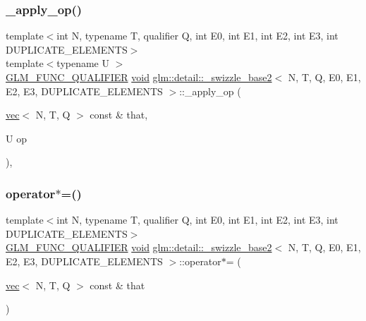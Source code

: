 \subsubsection{\texorpdfstring{\+\_\+apply\+\_\+op()}{\_apply\_op()}}
{\footnotesize\ttfamily template$<$int N, typename T, qualifier Q, int E0, int E1, int E2, int E3, int D\+U\+P\+L\+I\+C\+A\+T\+E\+\_\+\+E\+L\+E\+M\+E\+N\+TS$>$ \\
template$<$typename U $>$ \\
\mbox{\hyperlink{setup_8hpp_a33fdea6f91c5f834105f7415e2a64407}{G\+L\+M\+\_\+\+F\+U\+N\+C\+\_\+\+Q\+U\+A\+L\+I\+F\+I\+ER}} \mbox{\hyperlink{_s_d_l__opengles2__gl2ext_8h_ae5d8fa23ad07c48bb609509eae494c95}{void}} \mbox{\hyperlink{structglm_1_1detail_1_1__swizzle__base2}{glm\+::detail\+::\+\_\+swizzle\+\_\+base2}}$<$ N, T, Q, E0, E1, E2, E3, D\+U\+P\+L\+I\+C\+A\+T\+E\+\_\+\+E\+L\+E\+M\+E\+N\+TS $>$\+::\+\_\+apply\+\_\+op (\begin{DoxyParamCaption}\item[{\mbox{\hyperlink{structglm_1_1vec}{vec}}$<$ N, T, Q $>$ const \&}]{that,  }\item[{U}]{op }\end{DoxyParamCaption})\hspace{0.3cm}{\ttfamily [inline]}, {\ttfamily [protected]}}

\mbox{\label{structglm_1_1detail_1_1__swizzle__base2_a41a9fe45545f5adcd0c529c3a426e29f}} 
\subsubsection{\texorpdfstring{operator$\ast$=()}{operator*=()}}
{\footnotesize\ttfamily template$<$int N, typename T, qualifier Q, int E0, int E1, int E2, int E3, int D\+U\+P\+L\+I\+C\+A\+T\+E\+\_\+\+E\+L\+E\+M\+E\+N\+TS$>$ \\
\mbox{\hyperlink{setup_8hpp_a33fdea6f91c5f834105f7415e2a64407}{G\+L\+M\+\_\+\+F\+U\+N\+C\+\_\+\+Q\+U\+A\+L\+I\+F\+I\+ER}} \mbox{\hyperlink{_s_d_l__opengles2__gl2ext_8h_ae5d8fa23ad07c48bb609509eae494c95}{void}} \mbox{\hyperlink{structglm_1_1detail_1_1__swizzle__base2}{glm\+::detail\+::\+\_\+swizzle\+\_\+base2}}$<$ N, T, Q, E0, E1, E2, E3, D\+U\+P\+L\+I\+C\+A\+T\+E\+\_\+\+E\+L\+E\+M\+E\+N\+TS $>$\+::operator$\ast$= (\begin{DoxyParamCaption}\item[{\mbox{\hyperlink{structglm_1_1vec}{vec}}$<$ N, T, Q $>$ const \&}]{that }\end{DoxyParamCaption})\hspace{0.3cm}{\ttfamily [inline]}}


